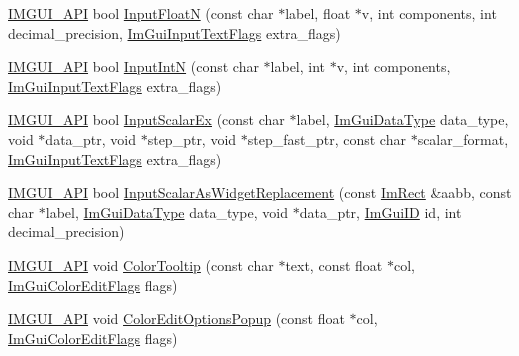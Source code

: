 \begin{DoxyCompactItemize}
\mbox{\hyperlink{imgui_8h_a43829975e84e45d1149597467a14bbf5}{I\+M\+G\+U\+I\+\_\+\+A\+PI}} bool \mbox{\hyperlink{namespace_im_gui_a7fe2c74d1c0042b77d8e6788faed0983}{Input\+FloatN}} (const char $\ast$label, float $\ast$v, int components, int decimal\+\_\+precision, \mbox{\hyperlink{imgui_8h_a7d2c6153a6b9b5d3178ce82434ac9fb8}{Im\+Gui\+Input\+Text\+Flags}} extra\+\_\+flags)
\item 
\mbox{\hyperlink{imgui_8h_a43829975e84e45d1149597467a14bbf5}{I\+M\+G\+U\+I\+\_\+\+A\+PI}} bool \mbox{\hyperlink{namespace_im_gui_a9b9aaec8d095156b74ee191b532fa137}{Input\+IntN}} (const char $\ast$label, int $\ast$v, int components, \mbox{\hyperlink{imgui_8h_a7d2c6153a6b9b5d3178ce82434ac9fb8}{Im\+Gui\+Input\+Text\+Flags}} extra\+\_\+flags)
\item 
\mbox{\hyperlink{imgui_8h_a43829975e84e45d1149597467a14bbf5}{I\+M\+G\+U\+I\+\_\+\+A\+PI}} bool \mbox{\hyperlink{namespace_im_gui_a08c243542b1678859cf0e065f9e43865}{Input\+Scalar\+Ex}} (const char $\ast$label, \mbox{\hyperlink{imgui__internal_8h_a22f27475affc8d8a1f2407887e5e1d19}{Im\+Gui\+Data\+Type}} data\+\_\+type, void $\ast$data\+\_\+ptr, void $\ast$step\+\_\+ptr, void $\ast$step\+\_\+fast\+\_\+ptr, const char $\ast$scalar\+\_\+format, \mbox{\hyperlink{imgui_8h_a7d2c6153a6b9b5d3178ce82434ac9fb8}{Im\+Gui\+Input\+Text\+Flags}} extra\+\_\+flags)
\item 
\mbox{\hyperlink{imgui_8h_a43829975e84e45d1149597467a14bbf5}{I\+M\+G\+U\+I\+\_\+\+A\+PI}} bool \mbox{\hyperlink{namespace_im_gui_a9b7223f54687d740a5961d7f278e01ef}{Input\+Scalar\+As\+Widget\+Replacement}} (const \mbox{\hyperlink{struct_im_rect}{Im\+Rect}} \&aabb, const char $\ast$label, \mbox{\hyperlink{imgui__internal_8h_a22f27475affc8d8a1f2407887e5e1d19}{Im\+Gui\+Data\+Type}} data\+\_\+type, void $\ast$data\+\_\+ptr, \mbox{\hyperlink{imgui_8h_a1785c9b6f4e16406764a85f32582236f}{Im\+Gui\+ID}} id, int decimal\+\_\+precision)
\item 
\mbox{\hyperlink{imgui_8h_a43829975e84e45d1149597467a14bbf5}{I\+M\+G\+U\+I\+\_\+\+A\+PI}} void \mbox{\hyperlink{namespace_im_gui_afad90b366b6471e3b13175c0ebeb26c8}{Color\+Tooltip}} (const char $\ast$text, const float $\ast$col, \mbox{\hyperlink{imgui_8h_a6b2d5e95adc38f22c021252189f669c6}{Im\+Gui\+Color\+Edit\+Flags}} flags)
\item 
\mbox{\hyperlink{imgui_8h_a43829975e84e45d1149597467a14bbf5}{I\+M\+G\+U\+I\+\_\+\+A\+PI}} void \mbox{\hyperlink{namespace_im_gui_a6bfb117816d669f8704e5d0c0c0795fe}{Color\+Edit\+Options\+Popup}} (const float $\ast$col, \mbox{\hyperlink{imgui_8h_a6b2d5e95adc38f22c021252189f669c6}{Im\+Gui\+Color\+Edit\+Flags}} flags)

\end{DoxyCompactItemize}
